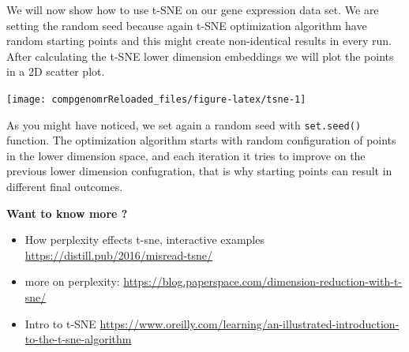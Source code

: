\documentclass[12pt,]{krantz}
\newenvironment{Shaded}{\begin{snugshade}}{\end{snugshade}}
\newcommand{\CommentTok}[1]{\textcolor[rgb]{0.56,0.35,0.01}{\textit{#1}}}
\newcommand{\DataTypeTok}[1]{\textcolor[rgb]{0.13,0.29,0.53}{#1}}
\newcommand{\DecValTok}[1]{\textcolor[rgb]{0.00,0.00,0.81}{#1}}
\newcommand{\KeywordTok}[1]{\textcolor[rgb]{0.13,0.29,0.53}{\textbf{#1}}}
\newcommand{\NormalTok}[1]{#1}
\newcommand{\OperatorTok}[1]{\textcolor[rgb]{0.81,0.36,0.00}{\textbf{#1}}}
\newcommand{\OtherTok}[1]{\textcolor[rgb]{0.56,0.35,0.01}{#1}}
\newcommand{\StringTok}[1]{\textcolor[rgb]{0.31,0.60,0.02}{#1}}
\providecommand{\tightlist}{%
  \setlength{\itemsep}{0pt}\setlength{\parskip}{0pt}}
\let\BeginKnitrBlock\begin \let\EndKnitrBlock\end
\begin{document}
We will now show how to use t-SNE on our gene expression data set. We are setting the random seed because again t-SNE optimization algorithm have random starting points and this might create non-identical results in every run. After calculating the t-SNE lower dimension embeddings we will plot the points in a 2D scatter plot.

\begin{Shaded}
\end{Shaded}

\begin{center}\texttt{[image: compgenomrReloaded\_files/figure-latex/tsne-1]} \end{center}

As you might have noticed, we set again a random seed with \texttt{set.seed()} function. The optimization algorithm starts with random configuration of points in the lower dimension space, and each iteration it tries to improve on the previous lower dimension confugration, that is why starting points can result in different final outcomes.

\BeginKnitrBlock{rmdtip}
\textbf{Want to know more ?}

\begin{itemize}
\tightlist
\item
  How perplexity effects t-sne, interactive examples \url{https://distill.pub/2016/misread-tsne/}
\item
  more on perplexity: \url{https://blog.paperspace.com/dimension-reduction-with-t-sne/}
\item
  Intro to t-SNE \url{https://www.oreilly.com/learning/an-illustrated-introduction-to-the-t-sne-algorithm}
\end{itemize}
\EndKnitrBlock{rmdtip}
\end{document}
